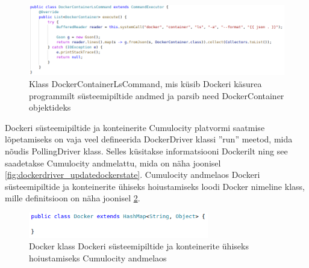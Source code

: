 \documentclass[12pt]{article}
\begin{document}
  \FloatBarrier
 
  
  \begin{figure} [ht] %
  \begin{center}
  \includegraphics[width=1.0\textwidth]{dockerdriver_dockercontainerlscommand}
  \caption{Klass DockerContainerLsCommand, mis küsib Dockeri käsurea programmilt süsteemipiltide andmed ja parsib need DockerContainer objektideks}
  \label{fig:dockerdriver_dockercontainerlscommand}
  \end{center}
  \end{figure}
 
  \FloatBarrier
  
  Dockeri süsteemipiltide ja konteinerite Cumulocity platvormi saatmise lõpetamiseks on vaja veel defineerida
  DockerDriver klassi ''run'' meetod, mida nõudis PollingDriver klass. Selles küsitakse informatsiooni Dockerilt
  ning see saadetakse Cumulocity andmelattu, mida on näha joonisel \ref{fig:dockerdriver_updatedockerstate}.
  Cumulocity andmelaos Dockeri süsteemipiltide ja konteinerite ühiseks hoiustamiseks loodi Docker nimeline klass,
  mille definitsioon on näha joonisel \ref{fig:dockerdriver_docker}.
 
  \begin{figure} [ht] %
  \begin{center}
  \includegraphics[width=0.7\textwidth]{dockerdriver_docker}
  \caption{Docker klass Dockeri süsteemipiltide ja konteinerite ühiseks hoiustamiseks Cumulocity andmelaos}
  \label{fig:dockerdriver_docker}
  \end{center}
  \end{figure}
 
  \FloatBarrier
 
 
 
\end{document}
